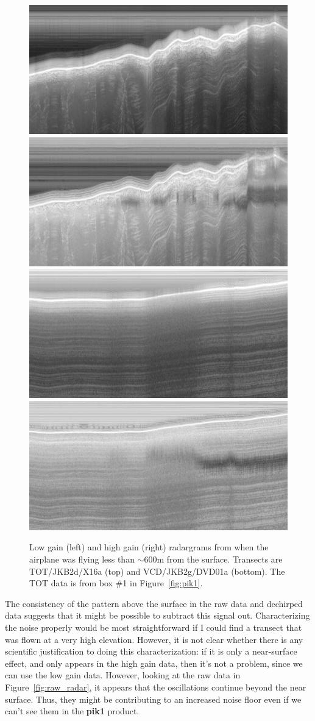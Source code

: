 \documentclass[11pt]{article}
\newcommand{\figref}[1]{Figure~\ref{#1}}
\begin{document}
\begin{figure}[ht!]
\centering
\includegraphics[width=0.49\columnwidth]{figures/TOT_ch1_DC_small.jpg}
\includegraphics[width=0.49\columnwidth]{figures/TOT_ch2_DC_small.jpg} \\
\vspace{2pt}
\includegraphics[width=0.49\columnwidth]{figures/VCD_ch1_DC_small.jpg}
\includegraphics[width=0.49\columnwidth]{figures/VCD_ch2_DC_small.jpg}
\caption[]{Low gain (left) and high gain (right) radargrams from when the airplane was flying less than $\sim$600m from the surface. Transects are TOT/JKB2d/X16a (top) and VCD/JKB2g/DVD01a (bottom). The TOT data is from box \#1 in \figref{fig:pik1}.}
\label{fig:ch2_DC_artifact}
\end{figure}

The consistency of the pattern above the surface in the raw data and dechirped data suggests that it might be possible to subtract this signal out. Characterizing the noise properly would be most straightforward if I could find a transect that was flown at a very high elevation. However, it is not clear whether there is any scientific justification to doing this characterization: if it is only a near-surface effect, and only appears in the high gain data, then it's not a problem, since we can use the low gain data. However, looking at the raw data in \figref{fig:raw_radar}, it appears that the oscillations continue beyond the near surface. Thus, they might be contributing to an increased noise floor even if we can't see them in the \textbf{pik1} product. 
\end{document}
